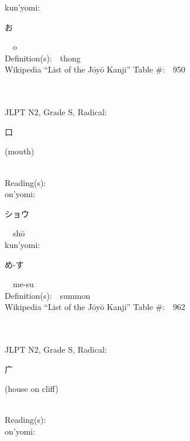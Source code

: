 \begin{multicols}{2}
{\hspace*{1em}}kun'yomi:\ \ \\
{\hspace*{2em}}{\begin{CJK}{UTF8}{min} お \end{CJK}}\ \ o\ \ \\
Definition(s):\ \ thong \\
Wikipedia ``List of the J\=oy\=o Kanji'' Table \#:\ \ 950 \\
\ \ \\
{\fontsize{34pt}{40pt}  }\ \ \\  %
{JLPT N2, Grade S, Radical:\ \ {\begin{CJK}{UTF8}{min} 口 \end{CJK}} (mouth) } \\
Reading(s):\ \ \\
{\hspace*{1em}}on'yomi:\ \ \\
{\hspace*{2em}}{\begin{CJK}{UTF8}{min} ショウ \end{CJK}}\ \ sh\=o\ \ \\
{\hspace*{1em}}kun'yomi:\ \ \\
{\hspace*{2em}}{\begin{CJK}{UTF8}{min} め-す \end{CJK}}\ \ me-su\ \ \\
Definition(s):\ \ summon \\
Wikipedia ``List of the J\=oy\=o Kanji'' Table \#:\ \ 962 \\
\ \ \\
{\fontsize{34pt}{40pt}  }\ \ \\  %
{JLPT N2, Grade S, Radical:\ \ {\begin{CJK}{UTF8}{min} 广 \end{CJK}} (house on cliff) } \\
Reading(s):\ \ \\
{\hspace*{1em}}on'yomi:\ \ \\

\end{multicols}
